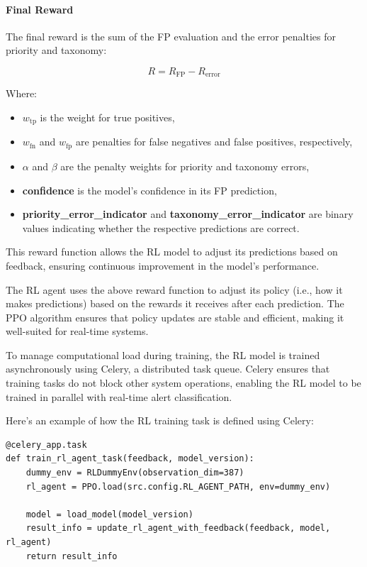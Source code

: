 \paragraph{Final Reward}
The final reward is the sum of the FP evaluation and the error penalties for priority and taxonomy:

\[
R = R_{\text{FP}} - R_{\text{error}}
\label{eq:final_reward}
\]

Where:
\begin{itemize}
    \item \( w_{\text{tp}} \) is the weight for true positives,
    \item \( w_{\text{fn}} \) and \( w_{\text{fp}} \) are penalties for false negatives and false positives, respectively,
    \item \( \alpha \) and \( \beta \) are the penalty weights for priority and taxonomy errors,
    \item \textbf{confidence} is the model’s confidence in its FP prediction,
    \item \textbf{priority\_error\_indicator} and \textbf{taxonomy\_error\_indicator} are binary values indicating whether the respective predictions are correct.
\end{itemize}

This reward function allows the RL model to adjust its predictions based on feedback, ensuring continuous improvement in the model's performance.

The RL agent uses the above reward function to adjust its policy (i.e., how it makes predictions) based on the rewards it receives after each prediction. 
The PPO algorithm ensures that policy updates are stable and efficient, making it well-suited for real-time systems.

To manage computational load during training, the RL model is trained asynchronously using Celery, a distributed task queue. 
Celery ensures that training tasks do not block other system operations, enabling the RL model to be trained in parallel with real-time alert classification.

Here's an example of how the RL training task is defined using Celery:

\vspace{0.2cm}
\noindent
\begin{minipage}{\linewidth}
\begin{verbatim}
@celery_app.task
def train_rl_agent_task(feedback, model_version):
    dummy_env = RLDummyEnv(observation_dim=387)
    rl_agent = PPO.load(src.config.RL_AGENT_PATH, env=dummy_env)

    model = load_model(model_version)
    result_info = update_rl_agent_with_feedback(feedback, model, rl_agent)
    return result_info
\end{verbatim}
\label{lst:rl_training_task}
\end{minipage}
\vspace{0.1cm}

